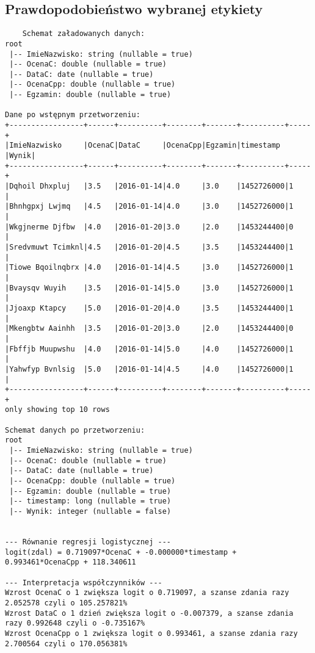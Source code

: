 \documentclass{article}
\begin{document}
\subsection{Prawdopodobieństwo wybranej etykiety}
\begin{verbatim}
    Schemat załadowanych danych:
root
 |-- ImieNazwisko: string (nullable = true)
 |-- OcenaC: double (nullable = true)
 |-- DataC: date (nullable = true)
 |-- OcenaCpp: double (nullable = true)
 |-- Egzamin: double (nullable = true)

Dane po wstępnym przetworzeniu:
+-----------------+------+----------+--------+-------+----------+-----+
|ImieNazwisko     |OcenaC|DataC     |OcenaCpp|Egzamin|timestamp |Wynik|
+-----------------+------+----------+--------+-------+----------+-----+
|Dqhoil Dhxpluj   |3.5   |2016-01-14|4.0     |3.0    |1452726000|1    |
|Bhnhgpxj Lwjmq   |4.5   |2016-01-14|4.0     |3.0    |1452726000|1    |
|Wkgjnerme Djfbw  |4.0   |2016-01-20|3.0     |2.0    |1453244400|0    |
|Sredvmuwt Tcimknl|4.5   |2016-01-20|4.5     |3.5    |1453244400|1    |
|Tiowe Bqoilnqbrx |4.0   |2016-01-14|4.5     |3.0    |1452726000|1    |
|Bvaysqv Wuyih    |3.5   |2016-01-14|5.0     |3.0    |1452726000|1    |
|Jjoaxp Ktapcy    |5.0   |2016-01-20|4.0     |3.5    |1453244400|1    |
|Mkengbtw Aainhh  |3.5   |2016-01-20|3.0     |2.0    |1453244400|0    |
|Fbffjb Muupwshu  |4.0   |2016-01-14|5.0     |4.0    |1452726000|1    |
|Yahwfyp Bvnlsig  |5.0   |2016-01-14|4.5     |4.0    |1452726000|1    |
+-----------------+------+----------+--------+-------+----------+-----+
only showing top 10 rows

Schemat danych po przetworzeniu:
root
 |-- ImieNazwisko: string (nullable = true)
 |-- OcenaC: double (nullable = true)
 |-- DataC: date (nullable = true)
 |-- OcenaCpp: double (nullable = true)
 |-- Egzamin: double (nullable = true)
 |-- timestamp: long (nullable = true)
 |-- Wynik: integer (nullable = false)


--- Równanie regresji logistycznej ---
logit(zdal) = 0.719097*OcenaC + -0.000000*timestamp + 0.993461*OcenaCpp + 118.340611

--- Interpretacja współczynników ---
Wzrost OcenaC o 1 zwiększa logit o 0.719097, a szanse zdania razy 2.052578 czyli o 105.257821%
Wzrost DataC o 1 dzień zwiększa logit o -0.007379, a szanse zdania razy 0.992648 czyli o -0.735167%
Wzrost OcenaCpp o 1 zwiększa logit o 0.993461, a szanse zdania razy 2.700564 czyli o 170.056381%


\end{verbatim}
\end{document}
